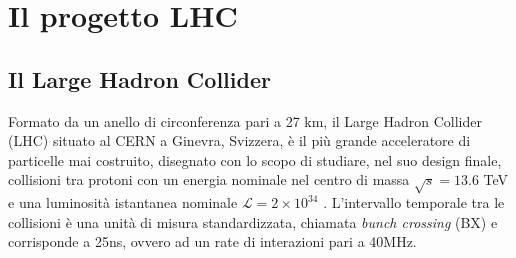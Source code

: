 \chapter{Il progetto LHC}
\label{cap:PrimoCapitolo}

\sloppy
\section{Il Large Hadron Collider}
\label{sec:LHC}
Formato da un anello di circonferenza pari a 27 km, il Large Hadron Collider (LHC) situato al CERN a Ginevra, Svizzera, è il più grande acceleratore di particelle mai costruito, disegnato con lo scopo di studiare, nel suo design finale, collisioni tra protoni con un energia nominale nel centro di massa $\sqrt{s} = 13.6$ TeV e una luminosità istantanea nominale $\mathcal{L} = 2 \times 10^{34}$ \Lumi. L'intervallo temporale tra le collisioni è una unità di misura standardizzata, chiamata \textit{bunch crossing} (BX) e corrisponde a 25ns, ovvero ad un rate di interazioni pari a 40MHz.


